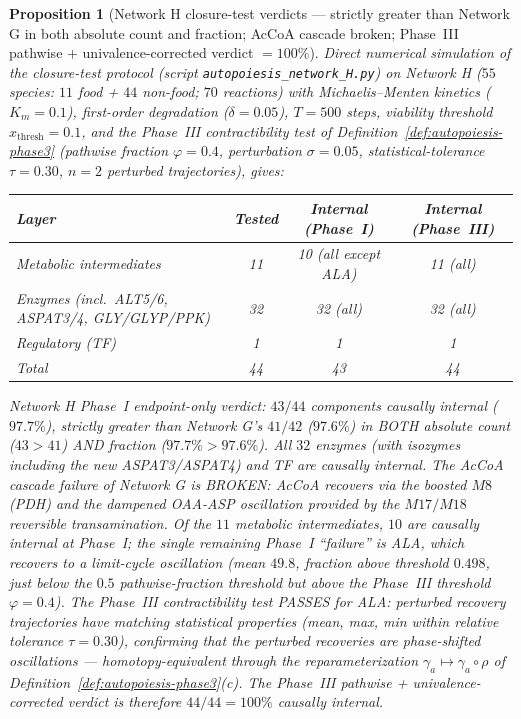 \documentclass[11pt,a4paper]{article}
\theoremstyle{plain}
\newtheorem{proposition}[theorem]{Proposition}
\theoremstyle{definition}
\theoremstyle{remark}
\begin{document}
\begin{proposition}[Network H closure-test verdicts --- strictly
greater than Network G in both absolute count and fraction; AcCoA
cascade broken; Phase~III pathwise + univalence-corrected verdict
$= 100\%$]
\label{prop:netH-verdict}
Direct numerical simulation of the closure-test protocol
(script \texttt{autopoiesis\_network\_H.py}) on Network H
($55$ species: $11$ food + $44$ non-food; $70$ reactions) with
Michaelis--Menten kinetics ($K_m = 0.1$), first-order degradation
($\delta = 0.05$), $T = 500$ steps, viability threshold
$x_{\mathrm{thresh}} = 0.1$, and the Phase~III contractibility test
of Definition~\ref{def:autopoiesis-phase3} (pathwise fraction
$\varphi = 0.4$, perturbation $\sigma = 0.05$, statistical-tolerance
$\tau = 0.30$, $n = 2$ perturbed trajectories), gives:
\begin{center}\footnotesize
\begin{tabular}{lccc}
\toprule
Layer & Tested & Internal (Phase~I) & Internal (Phase~III) \\
\midrule
Metabolic intermediates & 11 & 10 (all except ALA) & 11 (all) \\
Enzymes (incl.~ALT5/6, ASPAT3/4, GLY/GLYP/PPK) & 32 & 32 (all) & 32 (all) \\
Regulatory (TF) & 1 & 1 & 1 \\
\midrule
Total & 44 & 43 & 44 \\
\bottomrule
\end{tabular}
\end{center}
Network H Phase~I endpoint-only verdict: $43/44$ components causally
internal ($97.7\%$), strictly greater than Network G's $41/42$
($97.6\%$) in BOTH absolute count ($43 > 41$) AND fraction
($97.7\% > 97.6\%$). All $32$ enzymes (with isozymes including the new
ASPAT3/ASPAT4) and TF are causally internal. The AcCoA cascade
failure of Network G is BROKEN: AcCoA recovers via the boosted
$M8$ (PDH) and the dampened OAA-ASP oscillation provided by the
$M17/M18$ reversible transamination. Of the $11$ metabolic
intermediates, $10$ are causally internal at Phase~I; the single
remaining Phase~I ``failure'' is ALA, which recovers to a limit-cycle
oscillation (mean $49.8$, fraction above threshold $0.498$, just
below the $0.5$ pathwise-fraction threshold but above the
Phase~III threshold $\varphi = 0.4$). The Phase~III contractibility
test PASSES for ALA: perturbed recovery trajectories have matching
statistical properties (mean, max, min within relative tolerance
$\tau = 0.30$), confirming that the perturbed recoveries are
phase-shifted oscillations --- homotopy-equivalent through the
reparameterization $\gamma_a \mapsto \gamma_a \circ \rho$ of
Definition~\ref{def:autopoiesis-phase3}(c). The Phase~III pathwise +
univalence-corrected verdict is therefore $44/44 = 100\%$ causally
internal.
\end{proposition}
\end{document}
